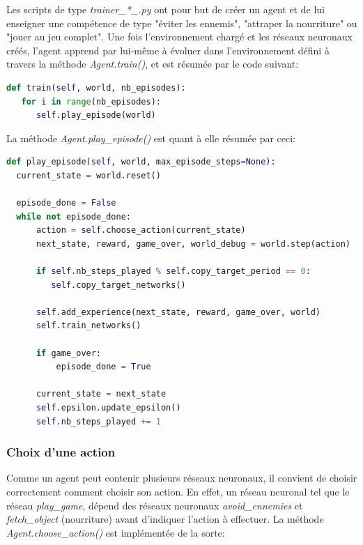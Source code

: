 \documentclass[11pt,a4paper]{report}
\begin{document}
  \par Les scripts de type \textit{trainer\_*\_.py} ont pour but de créer un agent et de lui enseigner une compétence de type "éviter les ennemis", "attraper la nourriture" ou "jouer au jeu complet". Une fois l'environnement chargé et les réseaux neuronaux créés, l'agent apprend par lui-même à évoluer dans l'environnement défini à travers la méthode \textit{Agent.train()}, et est résumée par le code suivant: 
  
  \begin{lstlisting}[language=python]
def train(self, world, nb_episodes):
   for i in range(nb_episodes):
      self.play_episode(world)
  \end{lstlisting} 
  
  \par La méthode \textit{Agent.play\_episode()} est quant à elle résumée par ceci: 
  
  \begin{lstlisting}[language=python]
def play_episode(self, world, max_episode_steps=None):
  current_state = world.reset()

  episode_done = False
  while not episode_done:
      action = self.choose_action(current_state)
      next_state, reward, game_over, world_debug = world.step(action)

      if self.nb_steps_played % self.copy_target_period == 0:
         self.copy_target_networks()

      self.add_experience(next_state, reward, game_over, world)
      self.train_networks()

      if game_over: 
          episode_done = True

      current_state = next_state
      self.epsilon.update_epsilon()
      self.nb_steps_played += 1

  \end{lstlisting} 
  
  \newpage
  \subsubsection{Choix d'une action}
  
  \par Comme un agent peut contenir plusieurs réseaux neuronaux, il convient de choisir correctement comment choisir son action. En effet, un réseau neuronal tel que le réseau \textit{play\_game}, dépend des réseaux neuronaux \textit{avoid\_ennemies} et \textit{fetch\_object} (nourriture) avant d'indiquer l'action à effectuer. La méthode \textit{Agent.choose\_action()} est implémentée de la sorte: 
  
\end{document}
